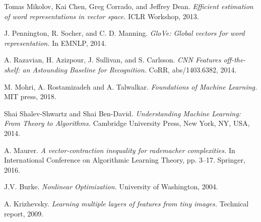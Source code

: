 \documentclass[12pt]{article}
\begin{document}
\begin{thebibliography}{9}
Tomas Mikolov, Kai Chen, Greg Corrado, and Jeffrey Dean. \textit{Efficient estimation of word representations
in vector space.} ICLR Workshop, 2013.

J. Pennington, R. Socher, and C. D. Manning. \textit{GloVe: Global vectors for word representation.} In EMNLP, 2014.

A. Razavian, H. Azizpour, J. Sullivan, and S. Carlsson. \textit{ CNN Features off-the-shelf: an Astounding Baseline
for Recognition.} CoRR, abs/1403.6382, 2014.

M.  Mohri, A. Rostamizadeh and A. Talwalkar.  \textit{Foundations of Machine Learning.} MIT press, 2018.

Shai Shalev-Shwartz and Shai Ben-David. \textit{Understanding Machine Learning: From Theory to Algorithms.} Cambridge University Press, New York, NY, USA, 2014.

A. Maurer. \textit{A vector-contraction inequality for rademacher
complexities.} In International Conference on Algorithmic Learning Theory, pp. 3–17. Springer, 2016.

J.V. Burke. \textit{Nonlinear Optimization.} 
University of Washington, 2004.

A. Krizhevsky.  \textit{Learning multiple layers of features from
tiny images.} Technical report, 2009.

\end{thebibliography}
\end{document}
